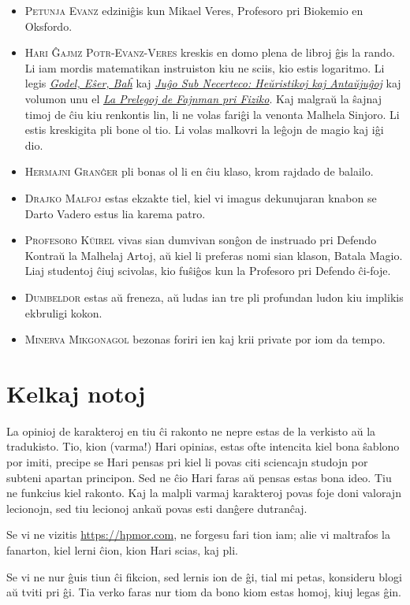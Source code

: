 \begin{itemize}
\item \textsc{Petunja Evanz} edziniĝis kun Mikael Veres, Profesoro pri Biokemio en Oksfordo.
\item \textsc{Hari Ĝajmz Potr-Evanz-Veres} kreskis en domo plena de libroj ĝis la rando.
  Li iam mordis matematikan instruiston kiu ne sciis, kio estis logaritmo.
  Li legis \href{https://books.google.com/books?vid=ISBN9780465026562}{\emph{Godel, Eŝer, Baĥ}}
  kaj \href{https://books.google.com/books?vid=ISBN9780521284141}{\emph{Juĝo Sub Necerteco: Heŭristikoj kaj Antaŭjuĝoj}}
  kaj volumon unu el \href{https://books.google.com/books?vid=ISBN9780201021158}{\emph{La Prelegoj de Fajnman pri Fiziko}}.
  Kaj malgraŭ la ŝajnaj timoj de ĉiu kiu renkontis lin, li ne volas fariĝi la venonta Malhela Sinjoro.
  Li estis kreskigita pli bone ol tio.
  Li volas malkovri la leĝojn de magio kaj iĝi dio.
\item \textsc{Hermajni Granĝer} pli bonas ol li en ĉiu klaso, krom rajdado de balailo.
\item \textsc{Drajko Malfoj} estas ekzakte tiel, kiel vi imagus dekunujaran knabon se Darto Vadero estus lia karema patro.
\item \textsc{Profesoro Kŭirel} vivas sian dumvivan sonĝon de instruado pri Defendo Kontraŭ la Malhelaj Artoj, aŭ kiel li preferas nomi sian klason, Batala Magio.
  Liaj studentoj ĉiuj scivolas, kio fuŝiĝos kun la Profesoro pri Defendo ĉi-foje.
\item \textsc{Dumbeldor} estas aŭ freneza, aŭ ludas ian tre pli profundan ludon kiu implikis ekbruligi kokon.
\item \textsc{Minerva Mikgonagol} bezonas foriri ien kaj krii private por iom da tempo.
\end{itemize}

%
%

\section*{Kelkaj notoj}

La opinioj de karakteroj en tiu ĉi rakonto ne nepre estas de la verkisto aŭ la tradukisto.
Tio, kion (varma!) Hari opinias, estas ofte intencita kiel bona ŝablono por imiti, precipe se Hari pensas pri kiel li povas citi sciencajn studojn por subteni apartan principon.
Sed ne ĉio Hari faras aŭ pensas estas bona ideo.
Tiu ne funkcius kiel rakonto.
Kaj la malpli varmaj karakteroj povas foje doni valorajn lecionojn, sed tiu lecionoj ankaŭ povas esti danĝere dutranĉaj.

Se vi ne vizitis \url{https://hpmor.com}, ne forgesu fari tion iam; alie vi maltrafos la fanarton, kiel lerni ĉion, kion Hari scias, kaj pli.

Se vi ne nur ĝuis tiun ĉi fikcion, sed lernis ion de ĝi, tial mi petas, konsideru blogi aŭ tviti pri ĝi.
Tia verko faras nur tiom da bono kiom estas homoj, kiuj legas ĝin.

